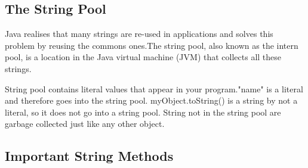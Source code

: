 \documentclass[a4paper]{report}   %
\begin{document}
\subsection{The String Pool}

Java realises that many strings are re-used in applications and solves this problem by reusing the commons ones.The string pool, also known as the intern pool, is a location in the Java virtual machine (JVM) that collects all these strings.

String pool contains literal values that appear in your program."name" is a literal and therefore goes into the string pool. myObject.toString() is a string by not a literal, so it does not go into a string pool. String not in the string pool are garbage collected just like any other object.

\subsection{Important String Methods}
\end{document}
